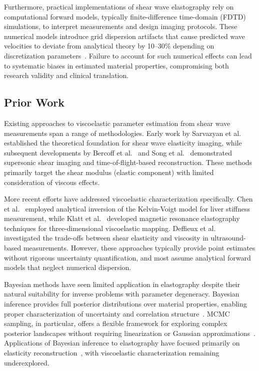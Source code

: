 \documentclass[journal]{IEEEtran}
\begin{document}
Furthermore, practical implementations of shear wave elastography rely on computational forward models, typically finite-difference time-domain (FDTD) simulations, to interpret measurements and design imaging protocols. These numerical models introduce grid dispersion artifacts that cause predicted wave velocities to deviate from analytical theory by 10--30\% depending on discretization parameters~\cite{virieux1986}. Failure to account for such numerical effects can lead to systematic biases in estimated material properties, compromising both research validity and clinical translation.

\subsection{Prior Work}

Existing approaches to viscoelastic parameter estimation from shear wave measurements span a range of methodologies. Early work by Sarvazyan et al.~\cite{sarvazyan1998} established the theoretical foundation for shear wave elasticity imaging, while subsequent developments by Bercoff et al.~\cite{bercoff2004} and Song et al.~\cite{song2014} demonstrated supersonic shear imaging and time-of-flight-based reconstruction. These methods primarily target the shear modulus (elastic component) with limited consideration of viscous effects.

More recent efforts have addressed viscoelastic characterization specifically. Chen et al.~\cite{chen2009} employed analytical inversion of the Kelvin-Voigt model for liver stiffness measurement, while Klatt et al.~\cite{klatt2008} developed magnetic resonance elastography techniques for three-dimensional viscoelastic mapping. Deffieux et al.~\cite{deffieux2009b} investigated the trade-offs between shear elasticity and viscosity in ultrasound-based measurements. However, these approaches typically provide point estimates without rigorous uncertainty quantification, and most assume analytical forward models that neglect numerical dispersion.

Bayesian methods have seen limited application in elastography despite their natural suitability for inverse problems with parameter degeneracy. Bayesian inference provides full posterior distributions over material properties, enabling proper characterization of uncertainty and correlation structure~\cite{gelman2014}. MCMC sampling, in particular, offers a flexible framework for exploring complex posterior landscapes without requiring linearization or Gaussian approximations~\cite{hastings1970}. Applications of Bayesian inference to elastography have focused primarily on elasticity reconstruction~\cite{prince2014,doyley2000}, with viscoelastic characterization remaining underexplored.
\end{document}
